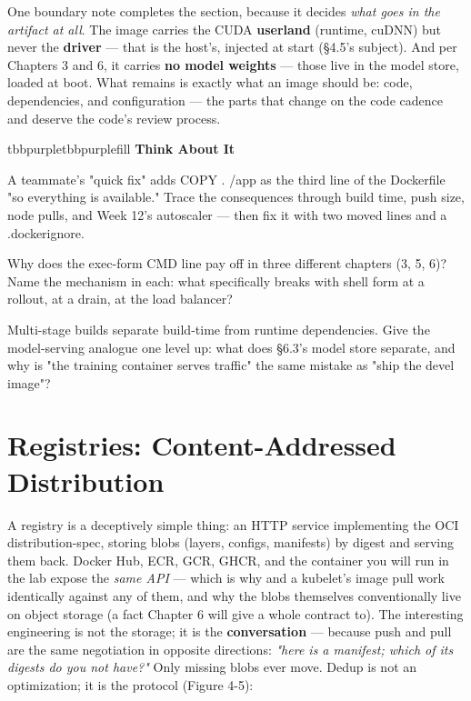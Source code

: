 \vspace{3.0pt}

One boundary note completes the section, because it decides \textit{what goes in the artifact at all}. The image carries the CUDA \textbf{userland} (runtime, cuDNN) but never the \textbf{driver} — that is the host's, injected at start (§4.5's subject). And per Chapters 3 and 6, it carries \textbf{no model weights} — those live in the model store, loaded at boot. What remains is exactly what an image should be: code, dependencies, and configuration — the parts that change on the code cadence and deserve the code's review process.

\begin{calloutbox}{tbbpurple}{tbbpurplefill}
{\normalsize\bfseries\color{tbbpurple}Think About It}\par\vspace{3pt}
\begin{tbbitemize}
  \item A teammate's "quick fix" adds COPY . /app as the third line of the Dockerfile "so everything is available." Trace the consequences through build time, push size, node pulls, and Week 12's autoscaler — then fix it with two moved lines and a .dockerignore.
  \item Why does the exec-form CMD line pay off in three different chapters (3, 5, 6)? Name the mechanism in each: what specifically breaks with shell form at a rollout, at a drain, at the load balancer?
  \item Multi-stage builds separate build-time from runtime dependencies. Give the model-serving analogue one level up: what does §6.3's model store separate, and why is "the training container serves traffic" the same mistake as "ship the devel image"?
\end{tbbitemize}
\end{calloutbox}

\section{Registries: Content-Addressed Distribution}

A registry is a deceptively simple thing: an HTTP service implementing the OCI distribution-spec, storing blobs (layers, configs, manifests) by digest and serving them back. Docker Hub, ECR, GCR, GHCR, and the  container you will run in the lab expose the \textit{same API} — which is why  and a kubelet's image pull work identically against any of them, and why the blobs themselves conventionally live on object storage (a fact Chapter 6 will give a whole contract to). The interesting engineering is not the storage; it is the \textbf{conversation} — because push and pull are the same negotiation in opposite directions: \textit{"here is a manifest; which of its digests do you not have?"} Only missing blobs ever move. Dedup is not an optimization; it is the protocol (Figure 4-5):

